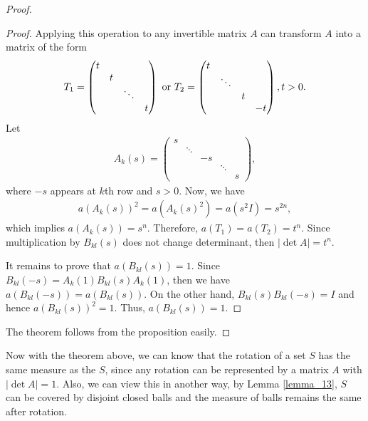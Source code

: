 \documentclass[11pt]{book}
\theoremstyle{definition}
\numberwithin{equation}{chapter}
\begin{document}
\begin{proof}
\begin{proof}
Applying this operation to any invertible matrix $A$ can transform $A$ into a matrix of the form
\begin{align*}
    T_1 = \begin{pmatrix}
        t & & & \\
        & t & & \\
        & & \ddots & \\
        & & & t
    \end{pmatrix} \,\, {\rm or}\,\, 
    T_2 = \begin{pmatrix}
        t & & & \\
        & \ddots & & \\
        & & t & \\
        & & & -t
    \end{pmatrix}, t > 0.
\end{align*}
Let
\begin{align*}
    A_k(s) = \begin{pmatrix}
        s & & & & \\
        & \ddots & & &\\
        & & -s & &\\
        & & & \ddots & \\
        & & & & s
    \end{pmatrix},
\end{align*}
where $-s$ appears at $k$th row and $s > 0$. Now, we have
\begin{align*}
    a\left(A_k(s)\right)^2 = a\left(A_k(s)^2\right) = a(s^2I) = s^{2n},
\end{align*}
which implies $a\left(A_k(s)\right) = s^n$. Therefore, $a(T_1) = a(T_2) = t^n$. Since multiplication by $B_{kl}(s)$ does not change determinant, then $\left|\det A\right| = t^n$. 

It remains to prove that $a(B_{kl}(s)) = 1$. Since $B_{kl}(-s) = A_k(1)B_{kl}(s)A_k(1)$, then we have $a(B_{kl}(-s)) = a(B_{kl}(s))$. On the other hand, $B_{kl}(s)B_{kl}(-s) = I$ and hence $a(B_{kl}(s))^2 = 1$. Thus, $a(B_{kl}(s)) = 1$.
\end{proof}
The theorem follows from the proposition easily.
\end{proof}

\medskip

Now with the theorem above, we can know that the rotation of a set $S$ has the same measure as the $S$, since any rotation can be represented by a matrix $A$ with $\left|\det A\right| = 1$. Also, we can view this in another way, by Lemma \ref{lemma_13}, $S$ can be covered by disjoint closed balls and the measure of balls remains the same after rotation.
\end{document}
